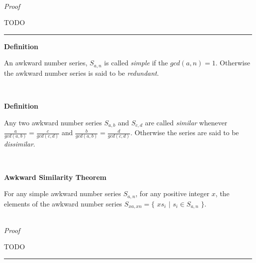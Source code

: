 \documentclass[a4paper,12pt]{article}
\begin{document}
\noindent \\
\textit{Proof}

\noindent TODO

\begin{center}
\noindent\rule{8cm}{0.4pt}
\end{center}








\label{definition:simple_and_redundant_series}
\hypertarget{definition:simple_and_redundant_series}{}
\begin{tcolorbox}
\textbf{Definition}

An awkward number series, $S_{a,n}$ is called \textit{simple} if the $gcd(a,n) = 1$. Otherwise the awkward number series is said to be \textit{redundant}.

\end{tcolorbox}
\noindent \\







\label{definition:similar_series}
\hypertarget{definition:similar_series}{}
\begin{tcolorbox}
\textbf{Definition}

Any two awkward number series $S_{a,b}$ and $S_{c,d}$ are called \textit{similar} whenever $\frac{a}{gcd(a,b)} = \frac{c}{gcd(c,d)}$ and $\frac{b}{gcd(a,b)} = \frac{d}{gcd(c,d)}$. Otherwise the series are said to be \textit{dissimilar}.

\end{tcolorbox}
\noindent \\





\label{theorem:similar_theorem}
\hypertarget{theorem:similar_theorem}{}
\begin{tcolorbox}
\textbf{Awkward Similarity Theorem}

\noindent For any simple awkward number series $S_{a, n}$, for any positive integer $x$, the elements of the awkward number series $S_{xa, xn} = \{$ $xs_i$ $|$ $s_i \in S_{a,n}$ $\}$.
\end{tcolorbox}

\noindent \\
\textit{Proof}

\noindent TODO

\begin{center}
\noindent\rule{8cm}{0.4pt}
\end{center}
\end{document}
